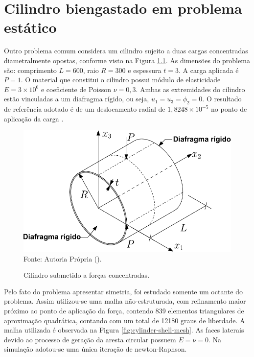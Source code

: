 \chapter[APÊNDICE \ref{Ap:Shell-cyl}]{Cilindro biengastado em problema estático}
\label{Ap:Shell-cyl}

Outro problema comum considera um cilindro sujeito a duas cargas concentradas diametralmente opostas, conforme visto na Figura \ref{fig:cylinder-shell}. As dimensões do problema são: comprimento $L=600$, raio $R=300$ e espessura $t=3$. A carga aplicada é $P=1$. O material que constitui o cilindro possui módulo de elasticidade $E=3\times10^6$ e coeficiente de Poisson $\nu=0,3$. Ambas as extremidades do cilindro estão vinculadas a um diafragma rígido, ou seja, $u_1=u_3=\phi_2=0$. O resultado de referência adotado é de um deslocamento radial de $1,8248\times10^{-5}$ no ponto de aplicação da carga \cite{BELYTSCHKO1985221,CHAUDINH2023110222,ZHOU2022108568}.

\begin{figure}[h!]
    \centering
    \caption{Cilindro submetido a forças concentradas.}
    \includegraphics[width=0.65\linewidth]{Figuras/cylinder-shell/cylinder.pdf}
    \\Fonte: Autoria Própria (\the\year).
    \label{fig:cylinder-shell}
\end{figure}

Pelo fato do problema apresentar simetria, foi estudado somente um octante do problema. Assim utilizou-se uma malha não-estruturada, com refinamento maior próximo ao ponto de aplicação da força, contendo 839 elementos triangulares de aproximação quadrática, contando com um total de 12180 graus de liberdade. A malha utilizada é observada na Figura \ref{fig:cylinder-shell-mesh}. As faces laterais devido ao processo de geração da aresta circular possuem $E=\nu=0$. Na simulação adotou-se uma única iteração de newton-Raphson.

